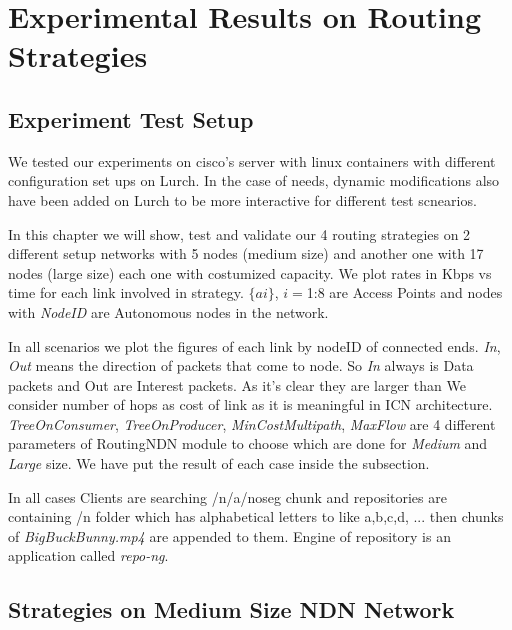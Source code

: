 
\chapter{Experimental Results on Routing Strategies} %

\label{expereince}


\section{Experiment Test Setup}
We tested our experiments on cisco's server with linux containers with different configuration set ups on Lurch. In the case of needs, dynamic modifications also have been added on Lurch to be more interactive for different test scnearios.

In this chapter we will show, test and validate our 4 routing strategies on 2 different setup networks with 5 nodes (medium size) and another one with 17 nodes (large size) each one with costumized capacity. We plot rates in Kbps vs time for each link involved in strategy. $\{ai\}$, $i=$1:8 are Access Points and nodes with \textit{NodeID} are Autonomous nodes in the network.
   
In all scenarios we plot the figures of each link by nodeID of connected ends. \textit{In}, \textit{Out} means the direction of packets that come to node. So \textit{In} always is Data packets and Out are Interest packets. As it's clear they are larger than We consider number of hops as cost of link as it is meaningful in ICN architecture.
\textit{TreeOnConsumer}, \textit{TreeOnProducer}, \textit{MinCostMultipath}, \textit{MaxFlow} are 4 different parameters of RoutingNDN module to choose which are done for \textit{Medium} and \textit{Large} size. We have put the result of each case inside the subsection.

In all cases Clients are searching /n/a/noseg chunk and repositories are containing /n folder which has alphabetical letters to like a,b,c,d, ... then chunks of \textit{BigBuckBunny.mp4} are appended to them. Engine of repository is an application called \textit{repo-ng}. 

\section{Strategies on Medium Size NDN Network}



